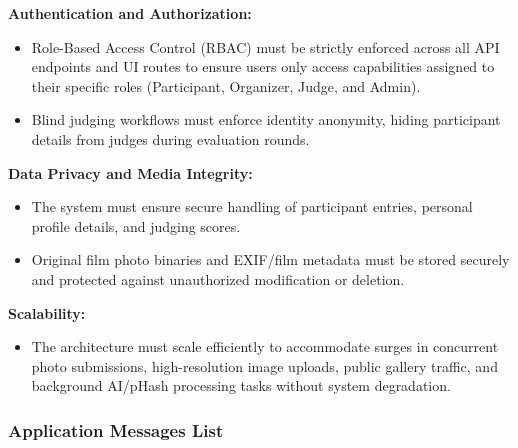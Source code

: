 \textbf{Authentication and Authorization:}
\begin{itemize}[leftmargin=1.5em, nosep]
    \item Role-Based Access Control (RBAC) must be strictly enforced across all API endpoints and UI routes to ensure users only access capabilities assigned to their specific roles (Participant, Organizer, Judge, and Admin).
    \item Blind judging workflows must enforce identity anonymity, hiding participant details from judges during evaluation rounds.
\end{itemize}

\vspace{0.5em}
\textbf{Data Privacy and Media Integrity:}
\begin{itemize}[leftmargin=1.5em, nosep]
    \item The system must ensure secure handling of participant entries, personal profile details, and judging scores.
    \item Original film photo binaries and EXIF/film metadata must be stored securely and protected against unauthorized modification or deletion.
\end{itemize}

\vspace{0.5em}
\textbf{Scalability:}
\begin{itemize}[leftmargin=1.5em, nosep]
    \item The architecture must scale efficiently to accommodate surges in concurrent photo submissions, high-resolution image uploads, public gallery traffic, and background AI/pHash processing tasks without system degradation.
\end{itemize}

\subsubsection{Application Messages List}
\label{subsubsec:application-messages-list}

